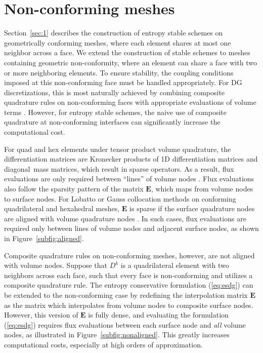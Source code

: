 \documentclass{svjour3}                     %
\begin{document}
\section{Non-conforming meshes}
\label{sec:2}

Section~\ref{sec:1} describes the construction of entropy stable schemes on geometrically conforming meshes, where each element shares at most one neighbor across a face.  We extend the construction of stable schemes to meshes containing geometric non-conformity, where an element can share a face with two or more neighboring elements.  To ensure stability, the coupling conditions imposed at this non-conforming face must be handled appropriately.  For DG discretizations, this is most naturally achieved by combining composite quadrature rules on non-conforming faces with appropriate evaluations of volume terms \cite{kozdon2018energy}.  However, for entropy stable schemes, the naive use of composite quadrature at non-conforming interfaces can significantly increase the computational cost.

For quad and hex elements under tensor product volume quadrature, the differentiation matrices are Kronecker products of 1D differentiation matrices and diagonal mass matrices, which result in sparse operators.  As a result, flux evaluations are only required between ``lines'' of volume nodes \cite{carpenter2014entropy, chan2018efficient}.  Flux evaluations also follow the sparsity pattern of the matrix $\bm{E}$, which maps from volume nodes to surface nodes.  For Lobatto or Gauss collocation methods on conforming quadrilateral and hexahedral meshes, $\bm{E}$ is sparse if the surface quadrature nodes are aligned with volume quadrature nodes \cite{chan2018efficient}.  In such cases, flux evaluations are required only between lines of volume nodes and adjacent surface nodes, as shown in Figure~\ref{subfig:aligned}.

Composite quadrature rules on non-conforming meshes, however, are not aligned with volume nodes.  Suppose that $D^k$ is a quadrilateral element with two neighbors across each face, such that every face is non-conforming and utilizes a composite quadrature rule.  The entropy conservative formulation (\ref{eq:esdg}) can be extended to the non-conforming case by redefining the interpolation matrix $\bm{E}$ as the matrix which interpolates from volume nodes to composite surface nodes.  However, this version of $\bm{E}$ is fully dense, and evaluating the formulation (\ref{eq:esdg}) requires flux evaluations between each surface node and \textit{all} volume nodes, as illustrated in Figure~\ref{subfig:nonaligned}.  This greatly increases computational costs, especially at high orders of approximation.  %
\end{document}
